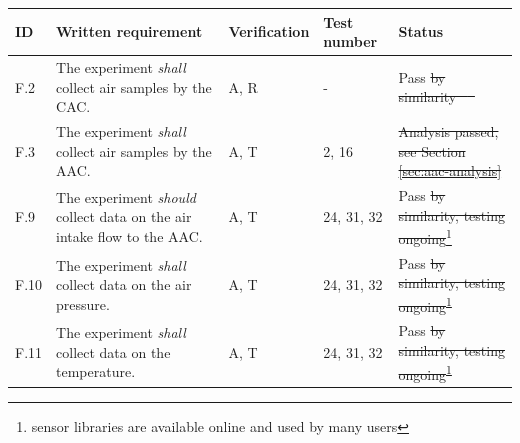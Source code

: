 \documentclass[a4paper,12pt,oneside]{article} %
\providecommand{\DIFaddtex}[1]{{\protect\color{blue}\uwave{#1}}} %
\providecommand{\DIFdeltex}[1]{{\protect\color{red}\sout{#1}}}                      %
\providecommand{\DIFaddbegin}{} %
\providecommand{\DIFaddend}{} %
\providecommand{\DIFdelbegin}{} %
\providecommand{\DIFdelend}{} %
\providecommand{\DIFadd}[1]{\texorpdfstring{\DIFaddtex{#1}}{#1}} %
\providecommand{\DIFdel}[1]{\texorpdfstring{\DIFdeltex{#1}}{}} %
\newcommand{\DIFscaledelfig}{0.5}
\newlength{\DIFdelgraphicswidth} %
\newlength{\DIFdelgraphicsheight} %
\newcommand{\DIFaddincludegraphics}[2][]{{\color{blue}\fbox{\DIFOincludegraphics[#1]{#2}}}} %
\newcommand{\DIFdelincludegraphics}[2][]{%
\sbox{\DIFdelgraphicsbox}{\DIFOincludegraphics[#1]{#2}}%
\settoboxwidth{\DIFdelgraphicswidth}{\DIFdelgraphicsbox} %
\settoboxtotalheight{\DIFdelgraphicsheight}{\DIFdelgraphicsbox} %
\scalebox{\DIFscaledelfig}{%
\parbox[b]{\DIFdelgraphicswidth}{\usebox{\DIFdelgraphicsbox}\\[-\baselineskip] \rule{\DIFdelgraphicswidth}{0em}}\llap{\resizebox{\DIFdelgraphicswidth}{\DIFdelgraphicsheight}{%
\setlength{\unitlength}{\DIFdelgraphicswidth}%
\begin{picture}(1,1)%
\thicklines\linethickness{2pt} %
{\color[rgb]{1,0,0}\put(0,0){\framebox(1,1){}}}%
{\color[rgb]{1,0,0}\put(0,0){\line( 1,1){1}}}%
{\color[rgb]{1,0,0}\put(0,1){\line(1,-1){1}}}%
\end{picture}%
}\hspace*{3pt}}} %
} %
\DeclareRobustCommand{\DIFaddbegin}{\DIFOaddbegin \let\includegraphics\DIFaddincludegraphics} %
\DeclareRobustCommand{\DIFaddend}{\DIFOaddend \let\includegraphics\DIFOincludegraphics} %
\DeclareRobustCommand{\DIFdelbegin}{\DIFOdelbegin \let\includegraphics\DIFdelincludegraphics} %
\DeclareRobustCommand{\DIFdelend}{\DIFOaddend \let\includegraphics\DIFOincludegraphics} %
\begin{document}
\begin{longtable}[]{|m{}| m{} |m{} |m{}|m{}|}

\hline
\textbf{ID}   & \textbf{Written requirement}                                                                                                                                                     & \textbf{Verification} & \textbf{Test number} & \textbf{Status} \\ \hline
F.2  & The experiment \textit{shall} collect air samples by the CAC.&  A, R & - & Pass \DIFdelbegin \DIFdel{by similarity \mbox{%
\cite{AircoreFlights} }\hspace{0pt}%
}\DIFdelend \\ \hline %
F.3  & The experiment \textit{shall} collect air samples by the AAC. & A, T& 2, 16 & \DIFdelbegin \DIFdel{Analysis passed, see Section \ref{sec:aac-analysis}}\DIFdelend \DIFaddbegin \DIFadd{Pass}\DIFaddend \\ \hline %
F.9  & The experiment \textit{should} collect data on the air intake flow to the AAC. & A, T & 24, 31, 32 & Pass \DIFdelbegin \DIFdel{by similarity, testing ongoing}\DIFdelend \footnote{sensor libraries are available online and used by many users\label{fn:sensor-libraries}}\\ \hline
F.10 & The experiment \textit{shall} collect data on the air pressure. & A, T& 24, 31, 32 & Pass \DIFdelbegin \DIFdel{by similarity, testing ongoing}\DIFdelend \textsuperscript{\ref{fn:sensor-libraries}}\\ \hline
F.11 & The experiment \textit{shall} collect data on the temperature. &  A, T& 24, 31, 32 & Pass \DIFdelbegin \DIFdel{by similarity, testing ongoing}\DIFdelend \textsuperscript{\ref{fn:sensor-libraries}}\\ \hline




\end{longtable}
\end{document}

